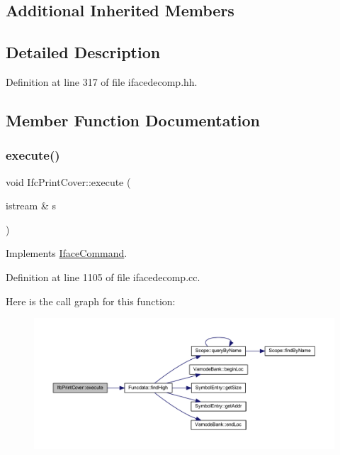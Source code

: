 \subsection*{Additional Inherited Members}


\subsection{Detailed Description}


Definition at line 317 of file ifacedecomp.\+hh.



\subsection{Member Function Documentation}
\mbox{\label{class_ifc_print_cover_a8869c00a9bbd7cecc498d1b675bc4bfe}} 
\subsubsection{\texorpdfstring{execute()}{execute()}}
{\footnotesize\ttfamily void Ifc\+Print\+Cover\+::execute (\begin{DoxyParamCaption}\item[{istream \&}]{s }\end{DoxyParamCaption})\hspace{0.3cm}{\ttfamily [virtual]}}



Implements \mbox{\hyperlink{class_iface_command_af10e29cee2c8e419de6efe9e680ad201}{Iface\+Command}}.



Definition at line 1105 of file ifacedecomp.\+cc.

Here is the call graph for this function\+:
\nopagebreak
\begin{figure}[H]
\begin{center}
\leavevmode
\includegraphics[width=350pt]{class_ifc_print_cover_a8869c00a9bbd7cecc498d1b675bc4bfe_cgraph}
\end{center}
\end{figure}


